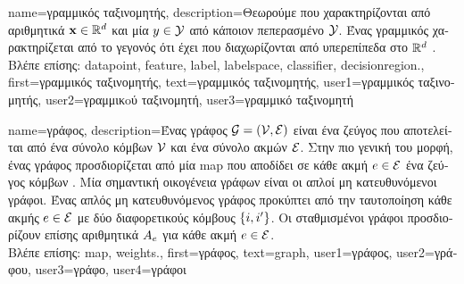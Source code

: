 {name={\foreignlanguage{greek}{γραμμικός ταξινομητής}}, 
	description={\foreignlanguage{greek}{Θεωρούμε} 
		 \foreignlanguage{greek}{που χαρακτηρίζονται από αριθμητικά}  ${\bf x} \in \mathbb{R}^{d}$ 
	    	\foreignlanguage{greek}{και μία}  $y \in \mathcal{Y}$ \foreignlanguage{greek}{από κάποιον
		πεπερασμένο}  $\mathcal{Y}$. 
		\foreignlanguage{greek}{Ένας γραμμικός}  \foreignlanguage{greek}{χαρακτηρίζεται από 
		το γεγονός ότι έχει}  \foreignlanguage{greek}{που διαχωρίζονται από υπερεπίπεδα 
		στο} $\mathbb{R}^{d}$ \cite[\foreignlanguage{greek}{Κεφ.} 2]{MLBasics}.\\
		\foreignlanguage{greek}{Βλέπε επίσης:} \gls{datapoint}, \gls{feature}, \gls{label}, \gls{labelspace}, \gls{classifier}, \gls{decisionregion}.},
	first={\foreignlanguage{greek}{γραμμικός ταξινομητής}},
	text={\foreignlanguage{greek}{γραμμικός ταξινομητής}},
	user1={\foreignlanguage{greek}{γραμμικός ταξινομητής}}, %
	user2={\foreignlanguage{greek}{γραμμικoύ ταξινομητή}}, %
	user3={\foreignlanguage{greek}{γραμμικό ταξινομητή}} %
}

{name={\foreignlanguage{greek}{γράφος}},
	description={\foreignlanguage{greek}{Ένας γράφος} 
		$\mathcal{G} = \left( \mathcal{V},\mathcal{E} \right)$ \foreignlanguage{greek}{είναι 
		ένα ζεύγος που αποτελείται από ένα σύνολο κόμβων $\mathcal{V}$ και ένα σύνολο ακμών $\mathcal{E}$. Στην πιο γενική του μορφή, ένας γράφος 
		προσδιορίζεται από μία} \gls{map} \foreignlanguage{greek}{που αποδίδει σε κάθε ακμή $e \in \mathcal{E}$ ένα ζεύγος κόμβων} \cite{RockNetworks}. 
		\foreignlanguage{greek}{Μία σημαντική οικογένεια γράφων εί\-ναι οι απλοί μη κατευθυνόμενοι γράφοι. Ένας απλός μη κατευθυνόμενος  
		γράφος προκύπτει από την ταυτοποίηση κάθε ακμής $e \in \mathcal{E}$ με δύο διαφορετικούς κόμβους $\{i,i'\}$. 
		Οι σταθμισμένοι γράφοι προσδιορίζουν επίσης αριθμητικά}  $A_{e}$ 
		\foreignlanguage{greek}{για κάθε ακμή} $e \in \mathcal{E}$.\\
		\foreignlanguage{greek}{Βλέπε επίσης:} \gls{map}, \gls{weights}.},
	first={\foreignlanguage{greek}{γράφος}},
	text={graph},
	user1={\foreignlanguage{greek}{γράφος}}, %
  	user2={\foreignlanguage{greek}{γράφου}}, %
	user3={\foreignlanguage{greek}{γράφο}}, %
	user4={\foreignlanguage{greek}{γράφοι}} %
}

